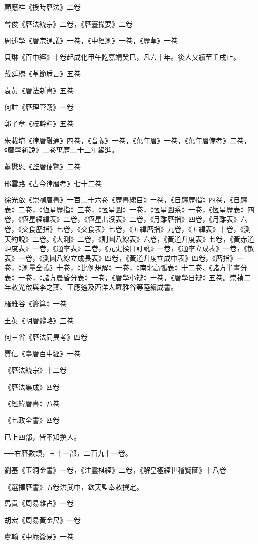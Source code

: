 顧應祥《授時曆法》二卷

曾俊《曆法統宗》二卷，《曆臺撮要》二卷

周述學《曆宗通議》一卷，《中經測》一卷，《歷草》一卷

貝琳《百中經》十卷起成化甲午訖嘉靖癸巳，凡六十年。後人又續至壬戌止。

戴廷槐《革節卮言》五卷

袁黃《曆法新書》五卷

何註《曆理管窺》一卷

郭子章《枝幹釋》五卷

朱載堉《律曆融通》四卷，《音義》一卷，《萬年曆》一卷，《萬年曆備考》二卷，《曆學新說》二卷萬歷二十三年編進。

蕭懋恩《監曆便覽》二卷

邢雲路《古今律曆考》七十二卷

徐光啟《崇禎曆書》一百二十六卷《歷書總目》一卷，《日躔歷指》四卷，《日躔表》二卷，《恆星歷指》三卷，《恆星圖》一卷，《恆星圖系》一卷，《恆星歷表》四卷，《恆星經緯表》二卷，《恆星出沒表》二卷，《月離曆指》四卷，《月離表》六卷，《交食歷指》七卷，《交食表》七卷，《五緯曆指》九卷，《五緯表》十卷，《測天約說》二卷。《大測》二卷，《割圓八線表》六卷，《黃道升度表》七卷，《黃赤道距度表》一卷，《通率表》二卷，《元史揆日訂訛》一卷，《通率立成表》一卷，《散表》一卷，《測圓八線立成長表》四卷，《黃道升度立成中表》四卷，《曆指》一卷，《測量全義》十卷，《比例規解》一卷，《南北高弧表》十二卷、《諸方半晝分表》一卷，《諸方晨昏分表》一卷，《曆學小辯》一卷，《曆學日辯》五卷。崇禎二年敕光啟與李之藻、王應遴及西洋人羅雅谷等陸續成書。

羅雅谷《籌算》一卷

王英《明曆體略》三卷

何三省《曆法同異考》四卷

賈信《臺曆百中經》一卷

《曆法統宗》十二卷

《曆法集成》四卷

《經緯曆書》八卷

《七政全書》四卷

已上四部，皆不知撰人。

──右曆數類，三十一部，二百九十一卷。

劉基《玉洞金書》一卷，《注靈棋經》二卷，《解皇極經世稽覽圖》十八卷

《選擇曆書》五卷洪武中，欽天監奉敕撰定。

馬貴《周易雜占》一卷

胡宏《周易黃金尺》一卷

盧翰《中庵簽易》一卷

